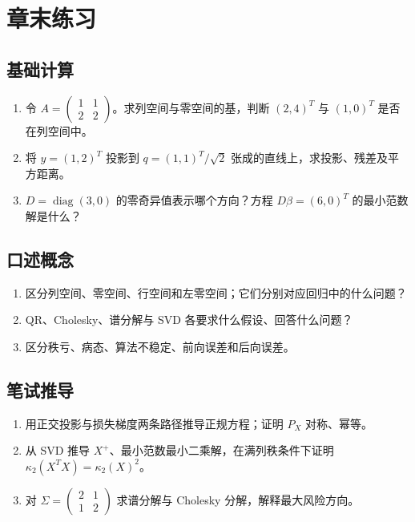 \section*{章末练习}
\begingroup\small
\subsection*{基础计算}
\begin{enumerate}[nosep,leftmargin=*]
\item 令 $A=\left(\begin{smallmatrix}1&1\\2&2\end{smallmatrix}\right)$。求列空间与零空间的基，判断 $(2,4)^T$ 与 $(1,0)^T$ 是否在列空间中。
\item 将 $y=(1,2)^T$ 投影到 $q=(1,1)^T/\sqrt2$ 张成的直线上，求投影、残差及平方距离。
\item $D=\operatorname{diag}(3,0)$ 的零奇异值表示哪个方向？方程 $D\beta=(6,0)^T$ 的最小范数解是什么？
\end{enumerate}

\subsection*{口述概念}
\begin{enumerate}[nosep,leftmargin=*]
  \item 区分列空间、零空间、行空间和左零空间；它们分别对应回归中的什么问题？
  \item QR、Cholesky、谱分解与 SVD 各要求什么假设、回答什么问题？
  \item 区分秩亏、病态、算法不稳定、前向误差和后向误差。
\end{enumerate}

\subsection*{笔试推导}
\begin{enumerate}[nosep,leftmargin=*]
  \item 用正交投影与损失梯度两条路径推导正规方程；证明 $P_X$ 对称、幂等。
  \item 从 SVD 推导 $X^+$、最小范数最小二乘解，在满列秩条件下证明 $\kappa_2(X^TX)=\kappa_2(X)^2$。
  \item 对 $\Sigma=\left(\begin{smallmatrix}2&1\\1&2\end{smallmatrix}\right)$ 求谱分解与 Cholesky 分解，解释最大风险方向。
\end{enumerate}

